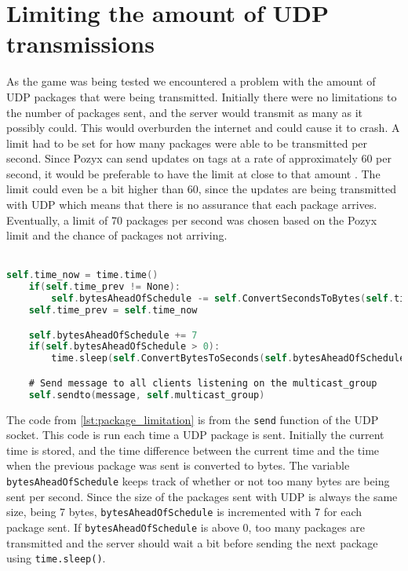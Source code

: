 \section{Limiting the amount of UDP transmissions}
As the game was being tested we encountered a problem with the amount of UDP packages that were being transmitted.
Initially there were no limitations to the number of packages sent, and the server would transmit as many as it possibly could.
This would overburden the internet and could cause it to crash.
A limit had to be set for how many packages were able to be transmitted per second.
Since Pozyx can send updates on tags at a rate of approximately 60 per second, it would be preferable to have the limit at close to that amount \autocite{pozyx-Performance}.
The limit could even be a bit higher than 60, since the updates are being transmitted with UDP which means that there is no assurance that each package arrives.
Eventually, a limit of 70 packages per second was chosen based on the Pozyx limit and the chance of packages not arriving.
\\\\
\begin{lstlisting}[caption={Implementaion of the limit on the amount of packages that can be sent per second}, captionpos=b,language=C,label={lst:package_limitation}]
    self.time_now = time.time()
    if(self.time_prev != None):
        self.bytesAheadOfSchedule -= self.ConvertSecondsToBytes(self.time_now - self.time_prev)
    self.time_prev = self.time_now

    self.bytesAheadOfSchedule += 7
    if(self.bytesAheadOfSchedule > 0):
        time.sleep(self.ConvertBytesToSeconds(self.bytesAheadOfSchedule))

    # Send message to all clients listening on the multicast_group
    self.sendto(message, self.multicast_group)
\end{lstlisting}
The code from \autoref{lst:package_limitation} is from the \texttt{send} function of the UDP socket.
This code is run each time a UDP package is sent.
Initially the current time is stored, and the time difference between the current time and the time when the previous package was sent is converted to bytes.
The variable \texttt{bytesAheadOfSchedule} keeps track of whether or not too many bytes are being sent per second.
Since the size of the packages sent with UDP is always the same size, being 7 bytes, \texttt{bytesAheadOfSchedule} is incremented with 7 for each package sent.
If \texttt{bytesAheadOfSchedule} is above 0, too many packages are transmitted and the server should wait a bit before sending the next package using \texttt{time.sleep()}.
